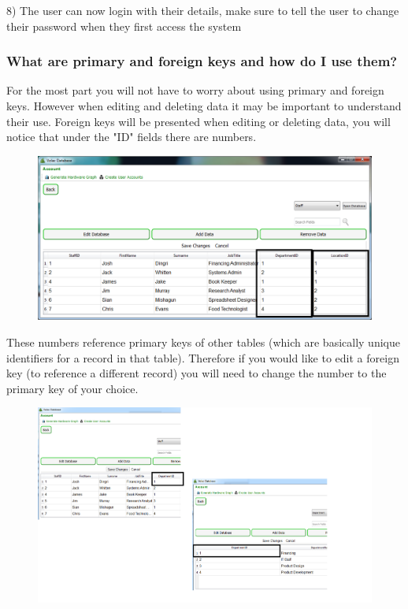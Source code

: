 8) The user can now login with their details, make sure to tell the user to change their password when they first access the system

\subsubsection{What are primary and foreign keys and how do I use them?}\label{keys}

For the most part you will not have to worry about using primary and foreign keys. However when editing and deleting data it may be important to understand their use. Foreign keys will be presented when editing or deleting data, you will notice that under the "ID" fields there are numbers.

\begin{figure}[H]
    \includegraphics[width=\textwidth]{./Manual/Images/foreign.png}
\end{figure}

These numbers reference primary keys of other tables (which are basically unique identifiers for a record in that table). Therefore if you would like to edit a foreign key (to reference a different record) you will need to change the number to the primary key of your choice.

\begin{figure}[H]
    \includegraphics[width=\textwidth]{./Manual/Images/foreign2.png}
\end{figure}

